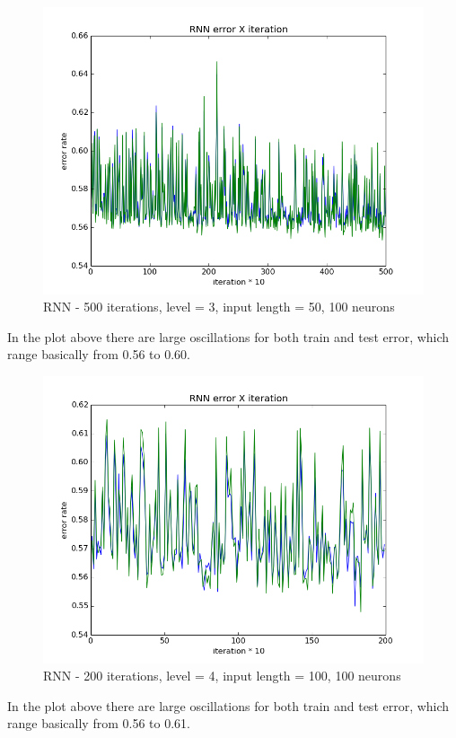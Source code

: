\documentclass[twoside]{article}
\begin{document}
\begin{multicols}{2}
\begin{figure}[H]
\centering
\includegraphics[scale=0.38]{../results/RNN_500iters_3level_50len_100hidden}
\caption{RNN - 500 iterations, level = 3, input length = 50, 100 neurons}
\label{ref:rnn}
\end{figure}
In the plot above there are large oscillations for both train and test error, which range basically from 0.56 to 0.60.
\begin{figure}[H]
\centering
\includegraphics[scale=0.38]{../results/RNN_200iters_4level_100len_100hidden}
\caption{RNN - 200 iterations, level = 4, input length = 100, 100 neurons}
\label{ref:rnn}
\end{figure}
In the plot above there are large oscillations for both train and test error, which range basically from 0.56 to 0.61.
\begin{figure}[H]
\centering


\end{figure}
\end{multicols}
\end{document}
